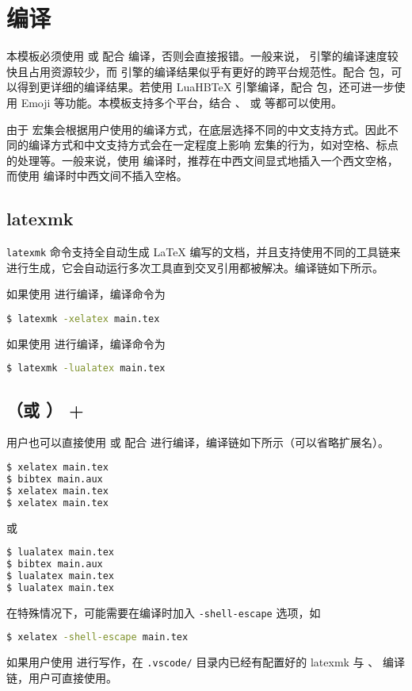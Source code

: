 \section{编译}
本模板必须使用  或  配合  编译，否则会直接报错。一般来说， 引擎的编译速度较快且占用资源较少，而  引擎的编译结果似乎有更好的跨平台规范性。配合  包，可以得到更详细的编译结果。若使用 LuaHB\TeX{} 引擎编译，配合  包，还可进一步使用 Emoji 等功能。\emojitest 本模板支持多个平台，结合 、 或  等都可以使用。

\begin{notice}
    由于 \CTeX 宏集会根据用户使用的编译方式，在底层选择不同的中文支持方式。因此不同的编译方式和中文支持方式会在一定程度上影响 \CTeX 宏集的行为，如对空格、标点的处理等。一般来说，使用  编译时，推荐在中西文间显式地插入一个西文空格，而使用  编译时中西文间不插入空格。
\end{notice}

\subsection{latexmk}
\verb|latexmk| 命令支持全自动生成 \LaTeX{} 编写的文档，并且支持使用不同的工具链来进行生成，它会自动运行多次工具直到交叉引用都被解决。编译链如下所示。

如果使用  进行编译，编译命令为
\lstset{basicstyle=\ttfamily, breaklines=true}
\begin{lstlisting}[language=bash]
$ latexmk -xelatex main.tex
\end{lstlisting}

如果使用  进行编译，编译命令为
\lstset{basicstyle=\ttfamily, breaklines=true}
\begin{lstlisting}[language=bash]
$ latexmk -lualatex main.tex
\end{lstlisting}

\subsection{（或 ） + }
用户也可以直接使用  或  配合  进行编译，编译链如下所示（可以省略扩展名）。
\begin{lstlisting}[language=bash]
$ xelatex main.tex  
$ bibtex main.aux
$ xelatex main.tex
$ xelatex main.tex
\end{lstlisting}
或
\begin{lstlisting}[language=bash]
$ lualatex main.tex  
$ bibtex main.aux
$ lualatex main.tex
$ lualatex main.tex
\end{lstlisting}

在特殊情况下，可能需要在编译时加入 \verb|-shell-escape| 选项，如
\begin{lstlisting}[language=bash]
$ xelatex -shell-escape main.tex 
\end{lstlisting}

如果用户使用  进行写作，在 \verb|.vscode/| 目录内已经有配置好的 latexmk 与 、 编译链，用户可直接使用。